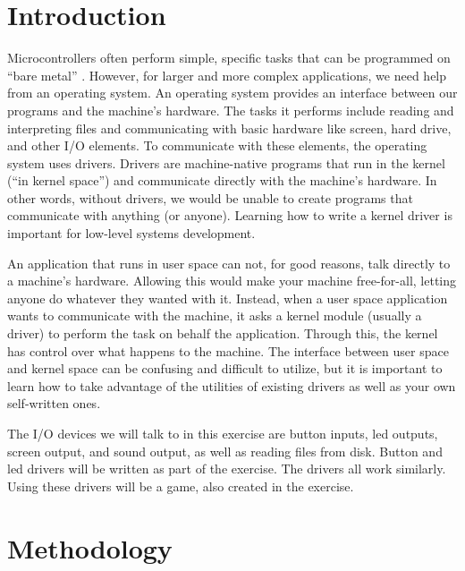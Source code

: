 \documentclass[12pt,a4paper,final]{report}
\numberwithin{equation}{section}
\numberwithin{table}{section}
\numberwithin{figure}{section}
\begin{document}
\tableofcontents

\newpage

\clearpage
{}

\cfoot{\thepage}

\section{Introduction}
\label{sec:introduction}
Microcontrollers often perform simple, specific tasks that can be programmed on “bare metal” . However, for larger and more complex applications, we need help from an operating system. An operating system provides an interface between our programs and the machine's hardware. The tasks it performs include reading and interpreting files and communicating with basic hardware like screen, hard drive, and other I/O elements. To communicate with these elements, the operating system uses drivers. Drivers are machine-native programs that run in the kernel (“in kernel space”) and communicate directly with the machine's hardware. In other words, without drivers, we would be unable to create programs that communicate with anything (or anyone). Learning how to write a kernel driver is important for low-level systems development.

An application that runs in user space can not, for good reasons, talk directly to a machine's hardware. Allowing this would make your machine free-for-all, letting anyone do whatever they wanted with it. Instead, when a user space application wants to communicate with the machine, it asks a kernel module (usually a driver) to perform the task on behalf the application. Through this, the kernel has control over what happens to the machine. The interface between user space and kernel space can be confusing and difficult to utilize, but it is important to learn how to take advantage of the utilities of existing drivers as well as your own self-written ones.

The I/O devices we will talk to in this exercise are button inputs, led outputs, screen output, and sound output, as well as reading files from disk. Button and led drivers will be written as part of the exercise. The drivers all work similarly. Using these drivers will be a game, also created in the exercise.

\newpage

\section{Methodology}
\label{sec:methodology}
\end{document}
